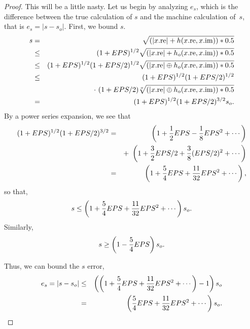 \begin{proof}{}
This will be a little nasty.  Let us begin by analyzing $e_s$, which is the difference between the true calculation of $s$ and
the machine calculation of~$s$, that is $e_s = |s - s_o|.$   First, we bound $s.$
\begin{eqnarray*}
s &=& \sqrt{(|x.\mathrm {re}| + h(x.\mathrm {re},x.\mathrm {im})) * 0.5}\\
&\le& (1+EPS)^{1/2} \sqrt{(|x.\mathrm {re}| + h_o(x.\mathrm {re},x.\mathrm {im}))
* 0.5}\\
&\le& (1+EPS)^{1/2} (1+EPS/2)^{1/2}
\sqrt{(|x.\mathrm {re}| \oplus h_o(x.\mathrm {re},x.\mathrm {im})) * 0.5}\\
&\le& (1+EPS)^{1/2} (1+EPS/2)^{1/2}\\
&&\cdot\ (1+EPS/2)
\root o \of {(|x.\mathrm {re}| \oplus h_o(x.\mathrm {re},x.\mathrm {im})) * 0.5}\\
&=& (1+EPS)^{1/2} (1+EPS/2)^{3/2} s_o.
\end{eqnarray*}
By a power series expansion, we see that
\begin{eqnarray*}
(1+EPS)^{1/2} (1+EPS/2)^{3/2}&=&\left(1 + {1 \over 2} EPS - {1 \over 8} EPS^2 + \cdots\right)\\
&& +\
     \left(1 + {3 \over 2} EPS/2 + {3 \over 8} (EPS/2)^2 +\cdots\right)\\
&=&\left(1 + {5 \over 4} EPS + {11 \over 32} EPS^2 +\cdots\right),
\end{eqnarray*}
so that,
$$s \le \left(1 + {5 \over 4} EPS + {11 \over 32} EPS^2 + \cdots\right) s_o.$$
Similarly, 
$$s \ge \left(1 - {5 \over 4} EPS\right) s_o.$$

Thus, we can bound the $s$ error, 
\begin{eqnarray*}
e_s = |s - s_o|&\le&\left(\left(1 + {5 \over 4} EPS + {11 \over 32} EPS^2 +\cdots\right) - 1\right) s_o\\
&=& \left({5 \over 4} EPS +
{11 \over 32} EPS^2 +\cdots\right) s_o.
\end{eqnarray*}


\end{proof}
